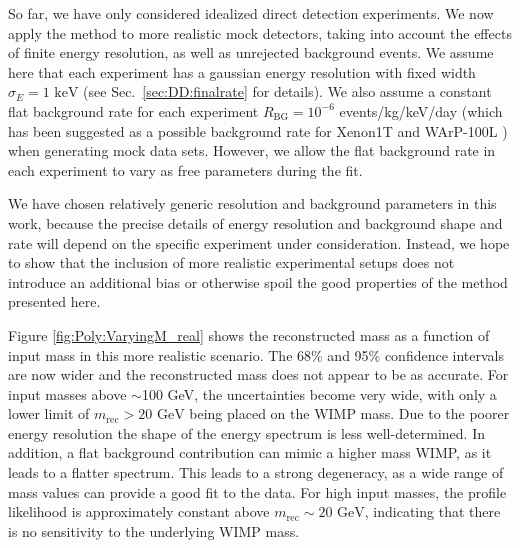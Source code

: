 
So far, we have only considered idealized direct detection experiments. We now apply the method to more realistic mock detectors, taking into account the effects of finite energy resolution, as well as unrejected background events. We assume here that each experiment has a gaussian energy resolution with fixed width $\sigma_E = 1 \textrm{ keV}$ (see Sec.~\ref{sec:DD:finalrate} for details). We also assume a constant flat background rate for each experiment $R_\textrm{BG} = 10^{-6}$ events/kg/keV/day (which has been suggested as a possible background rate for Xenon1T \cite{Aprile:2010} and WArP-100L \cite{Grandi:2005}) when generating mock data sets. However, we allow the flat background rate in each experiment to vary as free parameters during the fit.

We have chosen relatively generic resolution and background parameters in this work, because the precise details of energy resolution and background shape and rate will depend on the specific experiment under consideration. Instead, we hope to show that the inclusion of more realistic experimental setups does not introduce an additional bias or otherwise spoil the good properties of the method presented here.

Figure \ref{fig:Poly:VaryingM_real} shows the reconstructed mass as a function of input mass in this more realistic scenario. The 68\% and 95\% confidence intervals are now wider and the reconstructed mass does not appear to be as accurate. For input masses above $\sim$100 GeV, the uncertainties become very wide, with only a lower limit of $m_\textrm{rec} > 20 \textrm{ GeV}$ being placed on the WIMP mass.  Due to the poorer energy resolution the shape of the energy spectrum is less well-determined. In addition, a flat background contribution can mimic a higher mass WIMP, as it leads to a flatter spectrum. This leads to a strong degeneracy, as a wide range of mass values can provide a good fit to the data. For high input masses, the profile likelihood is approximately constant above $m_\textrm{rec} \sim 20 \textrm{ GeV}$, indicating that there is no sensitivity to the underlying WIMP mass.

